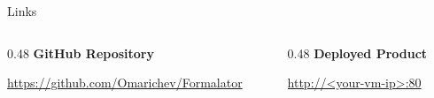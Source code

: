 \documentclass[11pt]{beamer}
\begin{document}
\begin{frame}{Links}

    \vspace{0.2cm}
    \begin{columns}[T]
        \begin{column}{0.48\textwidth}
            \textbf{GitHub Repository}
            \vspace{0.2cm}
            \begin{center}
                \scriptsize
                \url{https://github.com/Omarichev/Formalator}
                \vspace{0.2cm}

            \end{center}
        \end{column}

        \begin{column}{0.48\textwidth}
            \textbf{Deployed Product}
            \vspace{0.2cm}
            \begin{center}
                \scriptsize
                \url{http://<your-vm-ip>:80}
                \vspace{0.2cm}

            \end{center}
        \end{column}
    \end{columns}

\end{frame}
\end{document}
